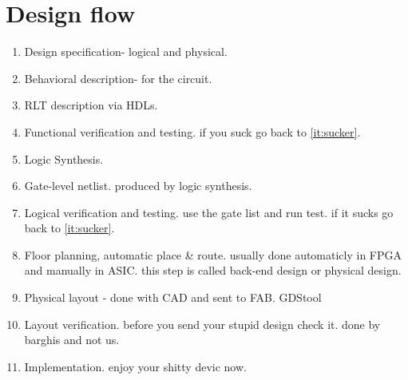 \section{Design flow}
\begin{enumerate}
    \item Design specification- logical and physical.
    \item Behavioral description- for the circuit.
    \item RLT description via HDLs. \label{it:sucker}
    \item Functional verification and testing. if you suck go back to \cref{it:sucker}.
    \item Logic Synthesis.
    \item Gate-level netlist. produced by logic synthesis.
    \item Logical verification and testing. use the gate list and run test. if it sucks go back to \cref{it:sucker}.
    \item Floor planning, automatic place \& route. usually done automaticly in FPGA and manually in ASIC. this step is called back-end design or physical design.
    \item Physical layout - done with CAD and sent to FAB. GDStool
    \item Layout verification. before you send your stupid design check it. done by barghis and not us.
    \item Implementation. enjoy your shitty devic now.
\end{enumerate}